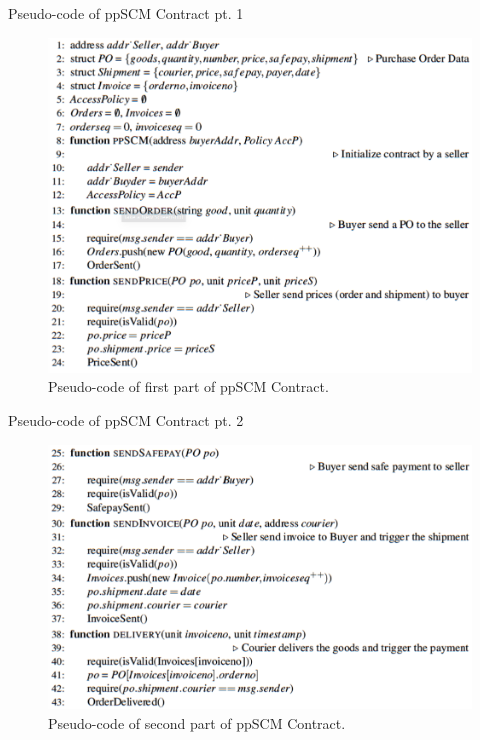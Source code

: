 \documentclass[11pt]{beamer}
\begin{document}
\begin{frame}{Pseudo-code of ppSCM Contract pt. 1}
\begin{figure}
\includegraphics[scale=0.25]{ppscmcontract1.png}
\caption{Pseudo-code of first part of ppSCM Contract.}
\label{ppscm1}
\end{figure}
\end{frame}
\begin{frame}{Pseudo-code of ppSCM Contract pt. 2}
\begin{figure}
\includegraphics[scale=0.3]{ppscmcontract2.png}
\caption{Pseudo-code of second part of ppSCM Contract.}
\label{ppscm2}
\end{figure}

\end{frame}
\end{document}

